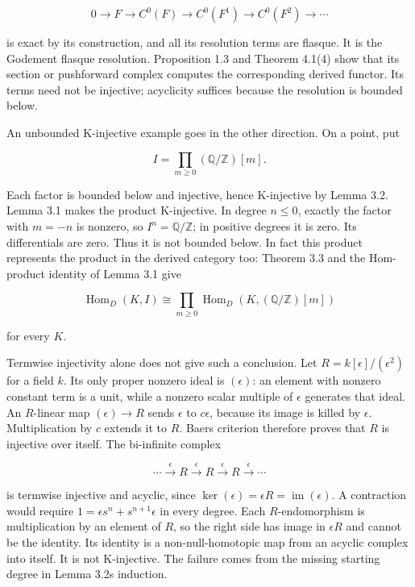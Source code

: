 \documentclass[
  english,
  11pt,
  a4paper,
]{article}
\begin{document}
\[0\to F\to C^0(F)\to C^0(F^1)\to C^0(F^2)\to\cdots\]

is exact by its construction, and all its resolution terms are flasque.
It is the Godement flasque resolution. Proposition 1.3 and Theorem
4.1(4) show that its section or pushforward complex computes the
corresponding derived functor. Its terms need not be injective;
acyclicity suffices because the resolution is bounded below.

An unbounded K-injective example goes in the other direction. On a
point, put

\[I=\prod_{m\ge0}(\mathbb Q/\mathbb Z)[m].\]

Each factor is bounded below and injective, hence K-injective by Lemma
3.2. Lemma 3.1 makes the product K-injective. In degree \(n\le0\),
exactly the factor with \(m=-n\) is nonzero, so
\(I^n=\mathbb Q/\mathbb Z\); in positive degrees it is zero. Its
differentials are zero. Thus it is not bounded below. In fact this
product represents the product in the derived category too: Theorem 3.3
and the Hom-product identity of Lemma 3.1 give

\[\operatorname{Hom}_D(K,I)
\cong\prod_{m\ge0}\operatorname{Hom}_D(K,(\mathbb Q/\mathbb Z)[m])\]

for every \(K\).

Termwise injectivity alone does not give such a conclusion. Let
\(R=k[\epsilon]/(\epsilon^2)\) for a field \(k\). Its only proper
nonzero ideal is \((\epsilon)\): an element with nonzero constant term
is a unit, while a nonzero scalar multiple of \(\epsilon\) generates
that ideal. An \(R\)-linear map \((\epsilon)\to R\) sends \(\epsilon\)
to \(c\epsilon\), because its image is killed by \(\epsilon\).
Multiplication by \(c\) extends it to \(R\). Baer\textquotesingle s
criterion therefore proves that \(R\) is injective over itself. The
bi-infinite complex

\[\cdots\xrightarrow\epsilon R\xrightarrow\epsilon R
\xrightarrow\epsilon R\xrightarrow\epsilon\cdots\]

is termwise injective and acyclic, since
\(\ker(\epsilon)=\epsilon R=\operatorname{im}(\epsilon)\). A contraction
would require \(1=\epsilon s^n+s^{n+1}\epsilon\) in every degree. Each
\(R\)-endomorphism is multiplication by an element of \(R\), so the
right side has image in \(\epsilon R\) and cannot be the identity. Its
identity is a non-null-homotopic map from an acyclic complex into
itself. It is not K-injective. The failure comes from the missing
starting degree in Lemma 3.2\textquotesingle s induction.
\end{document}
